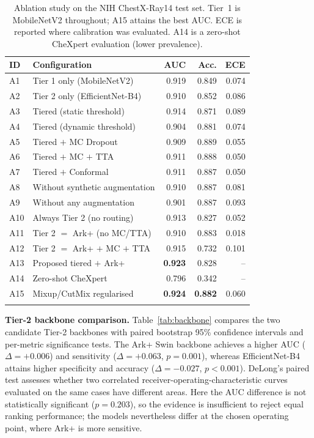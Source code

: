 \documentclass[pdflatex,sn-nature]{sn-jnl}
\begin{document}
\begin{table}[t]
\caption{Ablation study on the NIH ChestX-Ray14 test set. Tier~1 is MobileNetV2 throughout; A15 attains the best AUC. ECE is reported where calibration was evaluated. A14 is a zero-shot CheXpert evaluation (lower prevalence).}\label{tab:ablation}
\begin{tabular}{@{}llrrr@{}}
\toprule
ID & Configuration & AUC & Acc. & ECE\\
\midrule
A1 & Tier 1 only (MobileNetV2) & 0.919 & 0.849 & 0.074\\
A2 & Tier 2 only (EfficientNet-B4) & 0.910 & 0.852 & 0.086\\
A3 & Tiered (static threshold) & 0.914 & 0.871 & 0.089\\
A4 & Tiered (dynamic threshold) & 0.904 & 0.881 & 0.074\\
A5 & Tiered $+$ MC Dropout & 0.909 & 0.889 & 0.055\\
A6 & Tiered $+$ MC $+$ TTA & 0.911 & 0.888 & 0.050\\
A7 & Tiered $+$ Conformal & 0.911 & 0.887 & 0.050\\
A8 & Without synthetic augmentation & 0.910 & 0.887 & 0.081\\
A9 & Without any augmentation & 0.901 & 0.887 & 0.093\\
A10 & Always Tier 2 (no routing) & 0.913 & 0.827 & 0.052\\
A11 & Tier 2 $=$ Ark+ (no MC/TTA) & 0.910 & 0.883 & 0.018\\
A12 & Tier 2 $=$ Ark+ $+$ MC $+$ TTA & 0.915 & 0.732 & 0.101\\
A13 & Proposed tiered $+$ Ark+ & \textbf{0.923} & 0.828 & --\\
A14 & Zero-shot CheXpert & 0.796 & 0.342 & --\\
A15 & Mixup/CutMix regularised & \textbf{0.924} & \textbf{0.882} & 0.060\\
\botrule
\end{tabular}
\end{table}

\textbf{Tier-2 backbone comparison.} Table~\ref{tab:backbone} compares the two candidate Tier-2 backbones with paired bootstrap 95\% confidence intervals and per-metric significance tests. The Ark+ Swin backbone achieves a higher AUC ($\Delta=+0.006$) and sensitivity ($\Delta=+0.063$, $p=0.001$), whereas EfficientNet-B4 attains higher specificity and accuracy ($\Delta=-0.027$, $p<0.001$). DeLong's paired test assesses whether two correlated receiver-operating-characteristic curves evaluated on the same cases have different areas. Here the AUC difference is not statistically significant ($p=0.203$), so the evidence is insufficient to reject equal ranking performance; the models nevertheless differ at the chosen operating point, where Ark+ is more sensitive.
\end{document}
